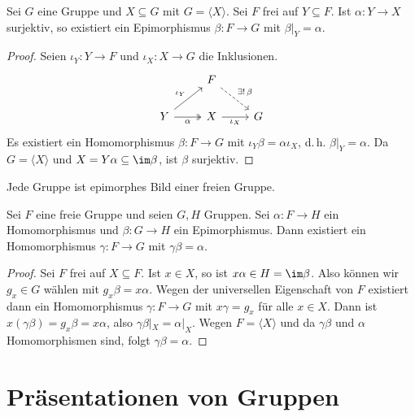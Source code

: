 \documentclass[11pt]{article}
\begin{document}
\begin{theorem}
  Sei $G$ eine Gruppe und $X \subseteq G$ mit $G = \langle X \rangle$. Sei $F$ frei auf $Y \subseteq F$. Ist $\alpha\colon Y \to X$ surjektiv, so existiert ein Epimorphismus $\beta\colon F \to G$ mit $\beta|_Y = \alpha$.
\end{theorem}

\begin{proof}
  Seien $\iota_Y\colon Y \to F$ und $\iota_X\colon X \to G$ die Inklusionen.
  \[
    \begin{tikzcd}
      & F \arrow[dashed]{dr}{\exists!\, \beta} & \\
      Y \arrow{ur}{\iota_Y} \arrow[two heads, swap]{r}{\alpha} & X \arrow[swap]{r}{\iota_X} & G
    \end{tikzcd}
  \]
  Es existiert ein Homomorphismus $\beta\colon F \to G$ mit $\iota_Y\beta = \alpha\iota_X$, d.\,h. $\beta|_Y = \alpha$. Da $G = \langle X \rangle$ und $X = Y\alpha \subseteq \im\beta$, ist $\beta$ surjektiv.
\end{proof}


\begin{corollary}
  Jede Gruppe ist epimorphes Bild einer freien Gruppe.
\end{corollary}

\begin{theorem}[Projektivität]\Theorem
  Sei $F$ eine freie Gruppe und seien $G, H$ Gruppen. Sei $\alpha\colon F \to H$ ein Homomorphismus und $\beta\colon G \to H$ ein Epimorphismus. Dann existiert ein Homomorphismus $\gamma\colon F \to G$ mit $\gamma\beta = \alpha$.
\end{theorem}


\begin{proof}
  Sei $F$ frei auf $X \subseteq F$. Ist $x \in X$, so ist $x\alpha \in H = \im\beta$. Also können wir $g_x \in G$ wählen mit $g_x\beta = x\alpha$.
  Wegen der universellen Eigenschaft von $F$ existiert dann ein Homomorphismus $\gamma\colon F \to G$ mit $x\gamma = g_x$ für alle $x \in X$. Dann ist $x(\gamma\beta) = g_x\beta = x\alpha$, also $\gamma\beta|_X = \alpha|_X$. Wegen $F = \langle X \rangle$ und da $\gamma\beta$ und $\alpha$ Homomorphismen sind, folgt $\gamma\beta = \alpha$.
\end{proof}


\section{Präsentationen von Gruppen}
\end{document}
